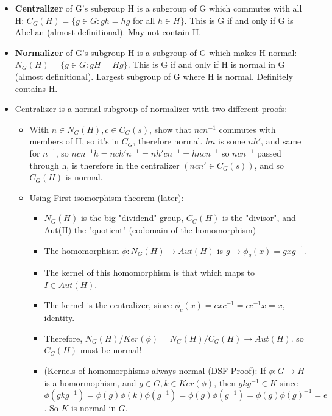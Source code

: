\documentclass[11pt, oneside]{article}   	%
\begin{document}
\begin{itemize}
\item \textbf{Centralizer} of G's subgroup H is a subgroup of G which commutes with all H: $C_G(H) = \{g \in G: gh = hg$ for all $h \in H\}$.  This is G if and only if G is Abelian (almost definitional).  May not contain H.
\item \textbf{Normalizer} of G's subgroup H is a subgroup of G which makes H normal: $N_G(H) = \{g \in G: gH= Hg\}$.  This is G if and only if H is normal in G (almost definitional).  Largest subgroup of G where H is normal.  Definitely contains H.
\item Centralizer is  a normal subgroup of normalizer with two different proofs:
\begin{itemize}
\item With $n \in N_G(H), c \in C_G(s)$, show that $ncn^{-1}$ commutes with members of H, so it's in $C_G$, therefore normal.  $hn$ is some $nh'$, and same for $n^{-1}$, so $ncn^{-1}h = nch'n^{-1} = nh'cn^{-1} = hncn^{-1}$ so $ncn^{-1}$ passed through h, is therefore in the centralizer $(ncn' \in C_G(s))$, and so $C_G(H)$ is normal.
\item Using First isomorphism theorem (later): 
  \begin{itemize}
  \item $N_G(H)$ is the big "dividend" group, $C_G(H)$ is the "divisor", and Aut(H) the "quotient" (codomain of the homomorphism)
  \item The homomorphism $\phi: N_G(H) \rightarrow Aut(H)$ is $g \rightarrow \phi_g(x) = gxg^{-1}$.
  \item The kernel of this homomorphism is that which maps to $I \in Aut(H)$.
  \item The kernel is the centralizer, since $\phi_c(x) = cxc^{-1} = cc^{-1}x = x$, identity.
  \item Therefore, $N_G(H) / Ker(\phi) = N_G(H) / C_G(H) \rightarrow Aut(H).$ so $C_G(H)$ must be normal!
  \item (Kernels of homomorphisms always normal (DSF Proof): If $\phi: G \rightarrow H$ is a homormophism, and $g \in G, k \in Ker(\phi)$, then $gkg^{-1} \in K$ since $\phi(gkg^{-1}) = \phi(g)\phi(k)\phi(g^{-1}) = \phi(g)\phi(g^{-1}) = \phi(g)\phi(g)^{-1} = e$.  So $K$ is normal in $G$.
  \end{itemize}
\end{itemize}

\end{itemize}
\end{document}
